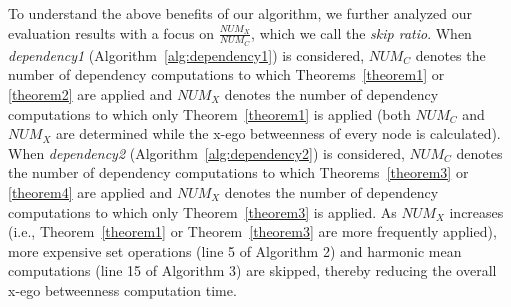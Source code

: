 To understand the above benefits of our algorithm, we further analyzed our evaluation results with a focus on $\frac{NUM_X}{NUM_C}$, which we call the {\em skip ratio}.
When {\em dependency1} (Algorithm~\ref{alg:dependency1}) is considered, $NUM_C$ denotes the number of dependency computations to which Theorems~\ref{theorem1} or \ref{theorem2} are applied and $NUM_X$ denotes the number of dependency computations to which only Theorem~\ref{theorem1} is applied (both $NUM_C$ and $NUM_X$ are determined while the x-ego betweenness of every node is calculated).
When {\em dependency2} (Algorithm~\ref{alg:dependency2}) is considered, $NUM_C$ denotes the number of dependency computations to which Theorems~\ref{theorem3} or \ref{theorem4} are applied and $NUM_X$ denotes the number of dependency computations to which only Theorem~\ref{theorem3} is applied.
As $NUM_X$ increases (i.e., Theorem~\ref{theorem1} or Theorem~\ref{theorem3} are more frequently applied), more expensive set operations (line 5 of Algorithm 2) and harmonic mean computations (line 15 of Algorithm 3) are skipped, thereby reducing the overall x-ego betweenness computation time.
 
